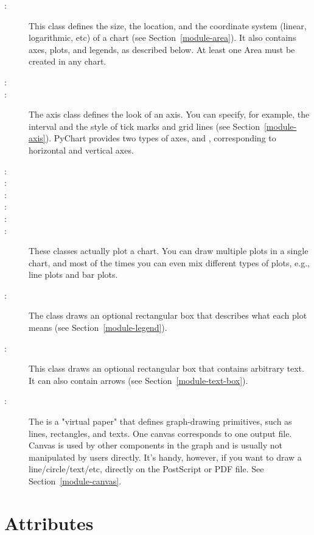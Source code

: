 \documentclass{howto}
\newcommand{\pychart}{PyChart}
\newcommand{\xref}[1]{See Section~\ref{#1}}
\newcommand{\pxref}[1]{see Section~\ref{#1}}
\begin{document}
\begin{description}
\item[:]

This class defines the size, the location, and the coordinate
system (linear, logarithmic, etc) of a chart (\pxref{module-area}).  It also
contains axes, plots, and legends, as described below.  At least one
Area must be created in any chart.

\item[:]
\item[:]
The axis class defines the look of an axis. You can specify, for
example, the interval and the style of tick marks and grid lines
(\pxref{module-axis}). \pychart{} provides two types of axes,  and
, corresponding to horizontal and vertical axes.

\item[:]
\item[:]
\item[:]
\item[:]
\item[:]
\item[:]
These classes actually plot a chart.  You can draw multiple plots in a
single chart, and most of the times you can even mix different types of
plots, e.g., line plots and bar plots.

\item[:]
The class draws an optional rectangular box that describes what each plot
means (\pxref{module-legend}).

\item[:]
This class draws an optional rectangular box that contains arbitrary
text.  It can also contain arrows (\pxref{module-text-box}).

\item[:]
The  is a "virtual paper" that defines graph-drawing
primitives, such as lines, rectangles, and texts. One canvas corresponds
to one output file. Canvas is used by other components in the graph and
is usually not manipulated by users directly.  It's handy, however, if
you want to draw a line/circle/text/etc, directly on the PostScript or
PDF file. \xref{module-canvas}.

\end{description}


\section{Attributes}\label{attribute}
\end{document}
